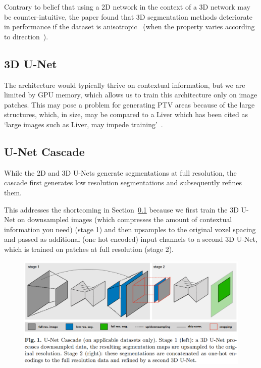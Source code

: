 \documentclass[11pt]{article}
\begin{document}
Contrary to belief that using a 2D network in the context of a 3D network may be counter-intuitive, the paper found that 3D segmentation methods deteriorate in performance if the dataset is anisotropic~\cite{nnunet} (when the property varies according to direction~\cite{anisotropy}).

\subsection{3D U-Net}\label{sec:3d-u-net}

The architecture would typically thrive on contextual information, but we are limited by GPU memory, which allows us to train this architecture only on image patches. This may pose a problem for generating PTV areas because of the large structures, which, in size, may be compared to a Liver which has been cited as `large images such as Liver, may impede training'~\cite{nnunet}.

\subsection{U-Net Cascade}\label{sec:u-net-cascade}

While the 2D and 3D U-Nets generate segmentations at full resolution, the cascade first generates low resolution segmentations and subsequently refines them.

This addresses the shortcoming in Section~\ref{sec:3d-u-net} because we first train the 3D U-Net on downsampled images (which compresses the amount of contextual information you need) (stage 1) and then upsamples to the original voxel spacing and passed as additional (one hot encoded) input channels to a second 3D U-Net, which is trained on patches at full resolution (stage 2).

\begin{figure}[H]
    \includegraphics[width=\linewidth]{images/nnunet-diagram.png}
\end{figure}

\printbibliography
\end{document}
